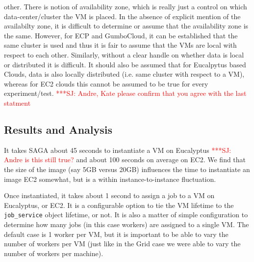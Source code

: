 \documentclass[conference,final]{IEEEtran}
\newcommand{\jhanote}[1]{ {\textcolor{red} { ***SJ: #1 }}}
\newcommand{\jhanote}[1]{}
\begin{document}
other. There is notion of availability zone, which is really just a
control on which data-center/cluster the VM is placed. In the absence
of explicit mention of the availabilty zone, it is difficult to
determine or assume that the availability zone is the same. However,
for ECP and GumboCloud, it can be established that the same cluster is
used and thus it is fair to assume that the VMs are local with respect
to each other.  Similarly, without a clear handle on whether data is
local or distributed it is difficult.  It should also be assumed that
for Eucalpytus based Clouds, data is also locally distributed (i.e.
same cluster with respect to a VM), whereas for EC2 clouds this cannot
be assumed to be true for every experiment/test. \jhanote{Andre, Kate
  please confirm that you agree with the last statment}

\subsection{Results and Analysis}


It takes SAGA about 45 seconds to instantiate a VM on Eucalyptus
\jhanote{Andre is this still true?}  and about 100 seconds on average
on EC2.  We find that the size of the image (say 5GB versus 20GB)
influences the time to instantiate an image EC2 somewhat, but is a
within instance-to-instance fluctuation.

Once instantiated, it takes about 1 second to assign a job to a VM on
Eucalyptus, or EC2.  It is a configurable option to tie the VM
lifetime to the \texttt{job\_service} object lifetime, or not.  It is
also a matter of simple configuration to determine how many jobs (in
this case workers) are assigned to a single VM. The default case is 1
worker per VM, but it is important to be able to vary the number of
workers per VM (just like in the Grid case we were able to vary the
number of workers per machine). 
\end{document}
